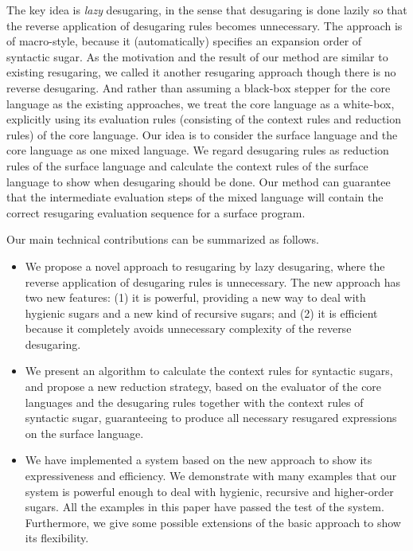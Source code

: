 The key idea is \emph{lazy} desugaring, in the sense that desugaring is done lazily  so that the reverse application of desugaring rules becomes unnecessary. The approach is of macro-style, because it (automatically) specifies an expansion order of syntactic sugar. As the motivation and the result of our method are similar to existing resugaring, we called it another resugaring approach though there is no reverse desugaring. And rather than assuming a black-box stepper for the core language as the existing approaches, we treat the core language as a white-box, explicitly using its evaluation rules (consisting of the context rules and reduction rules) of the core language.
Our idea is to consider the surface language and the core language as one mixed language. We regard desugaring rules as reduction rules of the surface language and calculate the context rules of the surface language to show when desugaring should be done. Our method can guarantee that the intermediate evaluation steps of the mixed language will contain the correct resugaring evaluation sequence for a surface program.

Our main technical contributions can be summarized as follows.
\begin{itemize}
\item We propose a novel approach to resugaring by lazy desugaring, where the reverse application of desugaring rules is unnecessary. The new approach has two new features: (1) it is powerful, providing a new way to deal with hygienic sugars and a new kind of recursive sugars; and (2) it is efficient because it completely avoids unnecessary complexity of the reverse desugaring.

\item We present an algorithm to calculate the context rules for syntactic sugars, and propose a new reduction strategy, based on the evaluator of the core languages and the desugaring rules together with the context rules of syntactic sugar, guaranteeing to produce all necessary resugared expressions on the surface language.

\item We have implemented a system based on the new approach to show its expressiveness and efficiency. We demonstrate with many examples that our system is powerful enough to deal with hygienic, recursive and higher-order sugars. All the examples in this paper have passed the test of the system. Furthermore, we give some possible extensions of the basic approach to show its flexibility.


\end{itemize}

